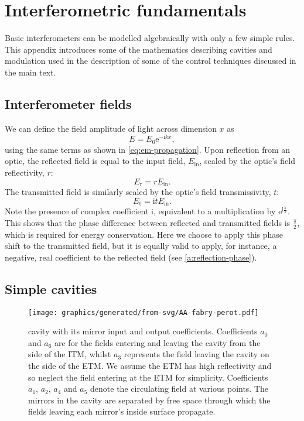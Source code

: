 \chapter{\label{a:interferometry}Interferometric fundamentals}
Basic interferometers can be modelled algebraically with only a few simple rules. This appendix introduces some of the mathematics describing \FP{} cavities and modulation used in the description of some of the control techniques discussed in the main text.

\section{Interferometer fields}
We can define the field amplitude of light across dimension $x$ as
\begin{equation}
  \label{eq:field-amplitude}
  E = E_0 \text{e}^{-\text{i} kx},
\end{equation}
using the same terms as shown in \cref{eq:em-propagation}. Upon reflection from an optic, the reflected field is equal to the input field, $E_{\text{in}}$, scaled by the optic's field reflectivity, $r$:
\begin{equation}
  \label{eq:reflected-field}
  E_{\text{r}} = rE_{\text{in}}.
\end{equation}
The transmitted field is similarly scaled by the optic's field transmissivity, $t$:
\begin{equation}
  \label{eq:transmitted-field}
  E_{\text{t}} = \text{i}tE_{\text{in}}.
\end{equation}
Note the presence of complex coefficient $\text{i}$, equivalent to a multiplication by $\text{e}^{\text{i} \frac{\pi}{2}}$. This shows that the phase difference between reflected and transmitted fields is $\frac{\pi}{2}$, which is required for energy conservation. Here we choose to apply this phase shift to the transmitted field, but it is equally valid to apply, for instance, a negative, real coefficient to the reflected field (see \cref{a:reflection-phase}).

\section{\label{sec:simple-cavities}Simple cavities}

\begin{figure}
  \centering
  \texttt{[image: graphics/generated/from-svg/AA-fabry-perot.pdf]}
  \caption[\FP{} cavity with its mirror input and output coefficients]{\label{fig:fabry-perot}\FP{} cavity with its mirror input and output coefficients. Coefficients $a_0$ and $a_6$ are for the fields entering and leaving the cavity from the side of the \gls{ITM}, whilst $a_3$ represents the field leaving the cavity on the side of the \gls{ETM}. We assume the \gls{ETM} has high reflectivity and so neglect the field entering at the \gls{ETM} for simplicity. Coefficients $a_1$, $a_2$, $a_4$ and $a_5$ denote the circulating field at various points. The mirrors in the cavity are separated by free space through which the fields leaving each mirror's inside surface propagate.}
\end{figure}

